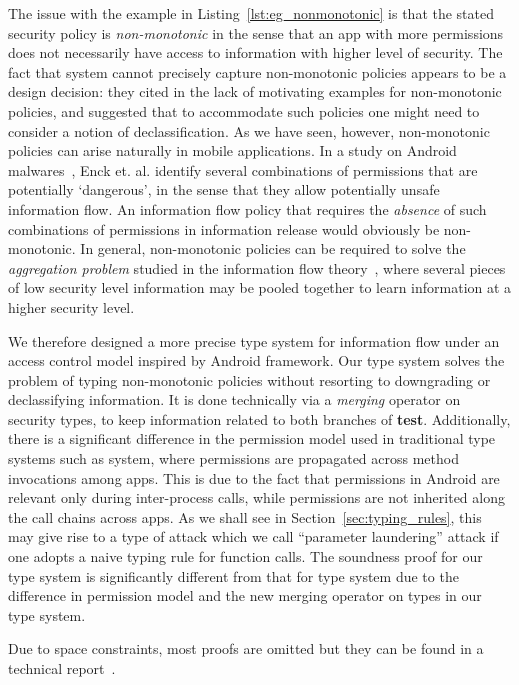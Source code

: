 The issue with the example in Listing~\ref{lst:eg_nonmonotonic} is that the stated security policy is \emph{non-monotonic} in the sense that an app with more permissions does not necessarily have access to information with higher
level of security.  The fact that {\BN} system
cannot precisely capture non-monotonic policies appears to be a design decision:
they cited in \cite{Banerjee:2005ht} the lack of motivating examples for non-monotonic policies, and
suggested that to accommodate such policies one might need to consider a notion of declassification.
As we have seen, however, non-monotonic policies can arise naturally in mobile
applications. In a study on Android
malwares~\cite{Enck:2009:UAS:1512148.1512324}, Enck et. al. 
identify several combinations of permissions that are potentially
`dangerous', in the sense that they allow potentially unsafe information flow.
An information flow policy that requires
the {\em absence} of such combinations of permissions in 
information release would obviously be non-monotonic.
In general, non-monotonic policies can be required to solve the {\em aggregation problem}
studied in the information flow theory~\cite{Landauer93}, where several pieces of low security level information may
be pooled together to learn information at a higher security level.

We therefore designed a more precise type system for information flow
under an access control model inspired by Android framework.
Our type system solves the problem of typing non-monotonic policies
without resorting to downgrading or declassifying information.
It is done technically via a \emph{merging} operator on security types, to keep information related to both
branches of \textbf{test}. Additionally, there is a significant
difference in the permission model used in traditional type systems such as {\BN} system, where permissions
are propagated across method invocations among apps. This is due to the fact that permissions in Android are relevant only during inter-process calls, while permissions are not inherited along the call
chains across apps. As we shall see in Section~\ref{sec:typing_rules}, this may give rise to a type of attack which we call
``parameter laundering'' attack if one adopts a naive typing rule for function calls.
The soundness proof for our type system is significantly different from that for {\BN} type system due to the difference
in permission model and the new merging operator on types in our type system.  

Due to space constraints, most proofs are omitted but they can be found in a technical report~\cite{Chen17arxiv}. 


